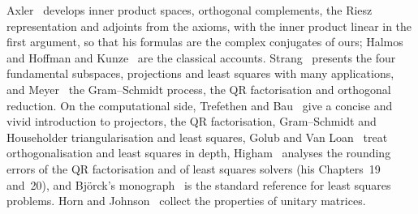 Axler~\cite[Chaps.~6 and~7]{axler2024} develops inner product spaces, orthogonal complements, the Riesz representation and adjoints from the axioms, with the inner product linear in the first argument, so that his formulas are the complex conjugates of ours; Halmos~\cite{halmos1958} and Hoffman and Kunze~\cite{hoffman1971} are the classical accounts. Strang~\cite{strang2016} presents the four fundamental subspaces, projections and least squares with many applications, and Meyer~\cite{meyer2000} the Gram--Schmidt process, the QR factorisation and orthogonal reduction. On the computational side, Trefethen and Bau~\cite{trefethen1997} give a concise and vivid introduction to projectors, the QR factorisation, Gram--Schmidt and Householder triangularisation and least squares, Golub and Van Loan~\cite[Chap.~5]{golub2013} treat orthogonalisation and least squares in depth, Higham~\cite{higham2002accuracy} analyses the rounding errors of the QR factorisation and of least squares solvers (his Chapters~19 and~20), and Bj\"orck's monograph~\cite{bjorck1996} is the standard reference for least squares problems. Horn and Johnson~\cite[Chap.~2]{horn2013} collect the properties of unitary matrices.

\chapterreferences
